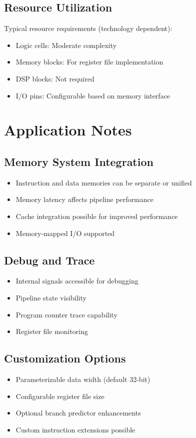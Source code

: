 \documentclass[11pt,a4paper]{article}
\begin{document}
\subsection{Resource Utilization}
Typical resource requirements (technology dependent):
\begin{itemize}
    \item Logic cells: Moderate complexity
    \item Memory blocks: For register file implementation
    \item DSP blocks: Not required
    \item I/O pins: Configurable based on memory interface
\end{itemize}

\section{Application Notes}

\subsection{Memory System Integration}
\begin{itemize}
    \item Instruction and data memories can be separate or unified
    \item Memory latency affects pipeline performance
    \item Cache integration possible for improved performance
    \item Memory-mapped I/O supported
\end{itemize}

\subsection{Debug and Trace}
\begin{itemize}
    \item Internal signals accessible for debugging
    \item Pipeline state visibility
    \item Program counter trace capability
    \item Register file monitoring
\end{itemize}

\subsection{Customization Options}
\begin{itemize}
    \item Parameterizable data width (default 32-bit)
    \item Configurable register file size
    \item Optional branch predictor enhancements
    \item Custom instruction extensions possible
\end{itemize}
\end{document}
